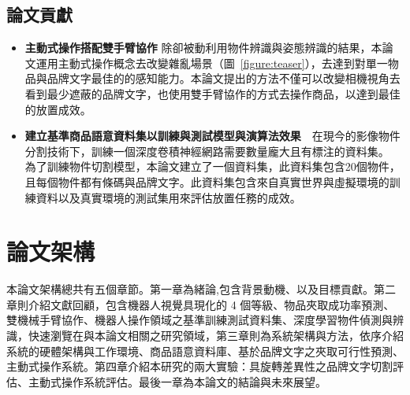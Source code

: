 \subsection{論文貢獻}
\begin{itemize}
\item \textbf{主動式操作搭配雙手臂協作} 除卻被動利用物件辨識與姿態辨識的結果，本論文運用主動式操作概念去改變雜亂場景（圖~\ref{figure:teaser}），去達到對單一物品與品牌文字最佳的的感知能力。本論文提出的方法不僅可以改變相機視角去看到最少遮蔽的品牌文字，也使用雙手臂協作的方式去操作商品，以達到最佳的放置成效。
\item \textbf{建立基準商品語意資料集以訓練與測試模型與演算法效果}　在現今的影像物件分割技術下，訓練一個深度卷積神經網路需要數量龐大且有標注的資料集。
為了訓練物件切割模型，本論文建立了一個資料集，此資料集包含20個物件，且每個物件都有條碼與品牌文字。此資料集包含來自真實世界與虛擬環境的訓練資料以及真實環境的測試集用來評估放置任務的成效。
\end{itemize}

\section{論文架構}
本論文架構總共有五個章節。第一章為緒論,包含背景動機、以及目標貢獻。第二章則介紹文獻回顧，包含機器人視覺具現化的 4 個等級、物品夾取成功率預測、雙機械手臂協作、機器人操作領域之基準訓練測試資料集、深度學習物件偵測與辨識，快速瀏覽在與本論文相關之研究領域，第三章則為系統架構與方法，依序介紹系統的硬體架構與工作環境、商品語意資料庫、基於品牌文字之夾取可行性預測、主動式操作系統。第四章介紹本研究的兩大實驗：具旋轉差異性之品牌文字切割評估、主動式操作系統評估。最後一章為本論文的結論與未來展望。

